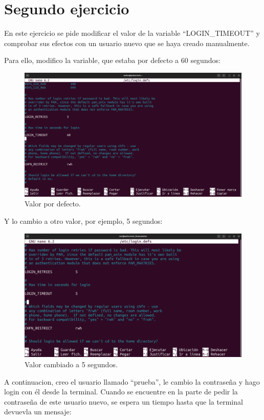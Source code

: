 \documentclass{article}
\begin{document}
\section{Segundo ejercicio}
En este ejercicio se pide modificar el valor de la variable ``LOGIN\_TIMEOUT'' y comprobar sus efectos con un usuario nuevo que se haya creado manualmente.

Para ello, modifico la variable, que estaba por defecto a 60 segundos:

\begin{figure}[H]
    \includegraphics[width=\textwidth]{imagenes/tout60.png}
    \caption{Valor por defecto.}
\end{figure}

Y lo cambio a otro valor, por ejemplo, 5 segundos:

\begin{figure}[H]
    \includegraphics[width=\textwidth]{imagenes/tout5.png}
    \caption{Valor cambiado a 5 segundos.}
\end{figure}

A continuacion, creo el usuario llamado ``prueba'', le cambio la contraseña y hago login con él desde la terminal. Cuando se encuentre en la parte de pedir la contraseña de este usuario nuevo, se espera un tiempo hasta que la terminal devuevla un mensaje:
\end{document}
